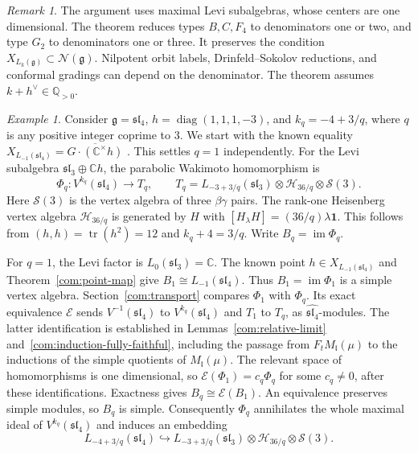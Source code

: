\documentclass[11pt,a4paper]{amsart}
\numberwithin{equation}{section}
\theoremstyle{definition}
\theoremstyle{remark}
\newtheorem{remark}[theorem]{Remark}
\newtheorem{example}[theorem]{Example}
\newcommand{\C}{\mathbb C}
\newcommand{\Q}{\mathbb Q}
\newcommand{\g}{\mathfrak g}
\newcommand{\lev}{\mathfrak l}
\newcommand{\N}{\mathcal N}
\newcommand{\slg}{\mathfrak{sl}}
\newcommand{\tr}{\operatorname{tr}}
\begin{document}
\begin{remark}
The argument uses maximal Levi subalgebras, whose centers are one dimensional.
The theorem reduces types $B,C,F_4$ to denominators one or two,
and type $G_2$ to denominators one or three. It preserves the condition
$X_{L_k(\g)}\subset\N(\g)$. Nilpotent orbit labels, Drinfeld--Sokolov reductions, and conformal gradings
can depend on the denominator. The theorem assumes $k+h^\vee\in\Q_{>0}$.
\end{remark}


\begin{example}\label{ex:sl4-transport}
Consider $\g=\slg_4$, $h=\operatorname{diag}(1,1,1,-3)$, and
$k_q=-4+3/q$, where $q$ is any positive integer coprime to $3$.
We start with the known equality
$X_{L_{-1}(\slg_4)}=\overline{G\cdot(\C^\times h)}$
\cite[Theorem~1.1]{ArakawaMoreau2017}. This settles $q=1$ independently.
For the Levi subalgebra $\slg_3\oplus\C h$, the parabolic Wakimoto
homomorphism is
$$
 \Phi_q:V^{k_q}(\slg_4)\longrightarrow T_q,
 \qquad
 T_q=L_{-3+3/q}(\slg_3)\otimes\mathcal H_{36/q}
       \otimes\mathcal S(3).
$$
Here $\mathcal S(3)$ is the vertex algebra of three $\beta\gamma$
pairs. The rank-one Heisenberg vertex algebra $\mathcal H_{36/q}$
is generated by $H$ with
$[H_\lambda H]=(36/q)\lambda\mathbf1$. This follows from
$(h,h)=\tr(h^2)=12$ and $k_q+4=3/q$.
Write $B_q=\operatorname{im}\Phi_q$.

For $q=1$, the Levi factor is $L_0(\slg_3)=\C$.
The known point $h\in X_{L_{-1}(\slg_4)}$ and
Theorem~\ref{com:point-map} give $B_1\cong L_{-1}(\slg_4)$.
Thus $B_1=\operatorname{im}\Phi_1$ is a simple vertex algebra.
Section~\ref{com:transport} compares $\Phi_1$ with $\Phi_q$.
Its exact equivalence $\mathcal E$ sends $V^{-1}(\slg_4)$ to
$V^{k_q}(\slg_4)$ and $T_1$ to $T_q$, as
$\widehat{\slg_4}$-modules.
The latter identification is established in
Lemmas~\ref{com:relative-limit} and~\ref{com:induction-fully-faithful},
including the passage from $F_tM_\lev(\mu)$ to the inductions of the
simple quotients of $M_\lev(\mu)$.
The relevant space of homomorphisms is one dimensional, so
$\mathcal E(\Phi_1)=c_q\Phi_q$ for some $c_q\ne0$, after these
identifications. Exactness gives $B_q\cong\mathcal E(B_1)$.
An equivalence preserves simple modules, so $B_q$ is simple.
Consequently $\Phi_q$ annihilates the whole maximal ideal of
$V^{k_q}(\slg_4)$ and induces an embedding
$$
 L_{-4+3/q}(\slg_4)\hookrightarrow
 L_{-3+3/q}(\slg_3)\otimes\mathcal H_{36/q}\otimes\mathcal S(3).
$$


\end{example}
\end{document}
